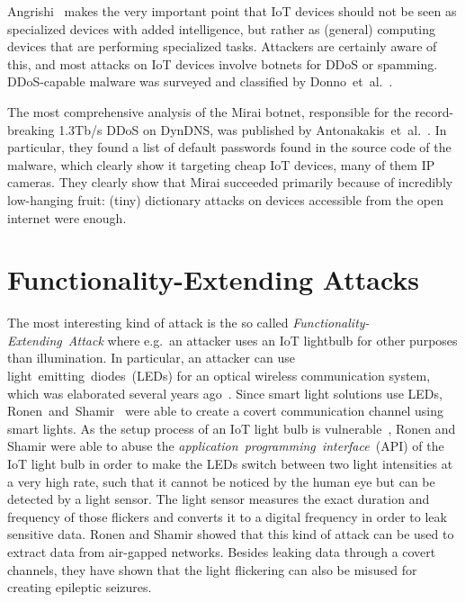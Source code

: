 \documentclass[11pt,a4paper]{article}
\begin{document}
	Angrishi~\cite{Angrishi:2017:TitiiiviIb} %
	makes the very important point that IoT devices should not be seen as specialized devices with added intelligence, but rather as (general) computing devices that are performing specialized tasks.
	Attackers are certainly aware of this, and most attacks on IoT devices involve botnets for DDoS or spamming. DDoS-capable malware was surveyed and classified by Donno~et~al.~\cite{Donno:2017:ADIM}.

	The most comprehensive analysis of the Mirai botnet, responsible for the record-breaking 1.3Tb/s DDoS on DynDNS, was published by
	Antonakakis~et~al.~\cite{Antonakakis:2017:UMB}. %
	In particular, they found a list of default passwords found in the source code of the malware, which clearly show it targeting cheap IoT devices, many of them IP cameras.
	They clearly show that Mirai succeeded primarily because of incredibly low-hanging fruit: (tiny) dictionary attacks on devices accessible from the open internet were enough.


	\section{Functionality-Extending Attacks}%
	\label{sec:functionality_extending_attacks}
The most interesting kind of attack is the so called \textit{Functionality-Extending~Attack} where e.g.\ an attacker uses an IoT lightbulb for other purposes than illumination.
	In particular, an attacker can use light~emitting~diodes~(LEDs) for an optical wireless communication system, which was elaborated several years ago~\cite{Komine:2004:FAfVLCSuLL, Elgala:2007:OVLWCBoWL}. %
	Since smart light solutions use LEDs, Ronen~and~Shamir~\cite{Ronen:2016:EFAIDCSL} were able to create a covert communication channel using smart lights.
	As the setup process of an IoT light bulb is vulnerable~\cite{Dhanjani:2013:HLSEPHPWLS, Morgner:2016:AYBBUICSSCLS, Ronen:2018:IGNCZCR}, Ronen and Shamir were able to abuse the \textit{application~programming~interface}~(API) of the IoT light bulb in order to make the LEDs switch between two light intensities at a very high rate, such that it cannot be noticed by the human eye but can be detected by a light sensor. %
	The light sensor measures the exact duration and frequency of those flickers and converts it to a digital frequency in order to leak sensitive data.
	Ronen and Shamir showed that this kind of attack can be used to extract data from air-gapped networks.
	Besides leaking data through a covert channels, they have shown that the light flickering can also be misused for creating epileptic seizures.

	\newpage

	
	
\end{document}
